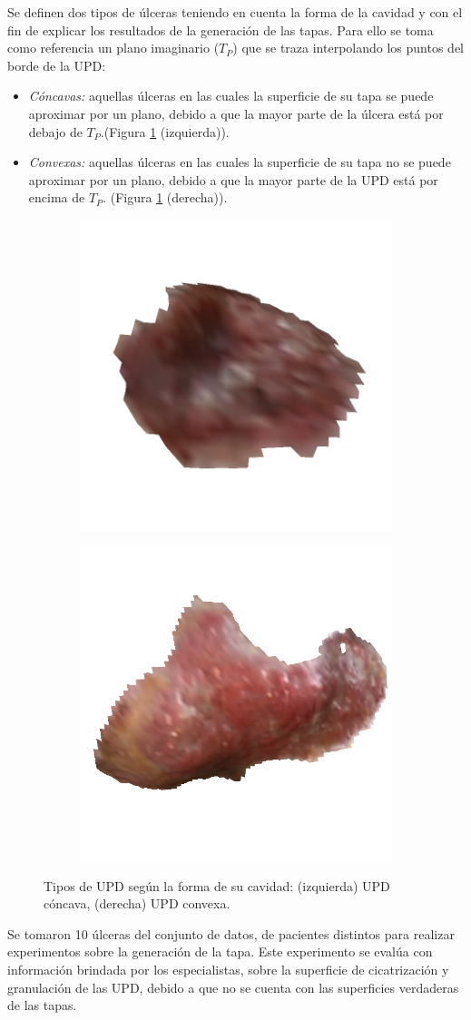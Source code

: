 Se definen dos tipos de úlceras teniendo en cuenta la forma de la cavidad y con el fin de explicar los resultados de la generación de las tapas. Para ello se toma como referencia un plano imaginario ($T_P$) que se traza interpolando los puntos del borde de la UPD:

\begin{itemize}
	\item \textit{Cóncavas:} aquellas úlceras en las cuales la superficie de su tapa se puede aproximar por un plano, debido a que la mayor parte de la úlcera está por debajo de $T_P$.(Figura \ref{fig:planar} (izquierda)).
	\item \textit{Convexas:} aquellas úlceras en las cuales la superficie de su tapa no se puede aproximar por un plano, debido a que la mayor parte de la UPD está por encima de $T_P$. (Figura \ref{fig:planar} (derecha)).
\end{itemize}

\begin{figure}[ht]
	\centering
	\begin{subfigure}
		\centering
		\includegraphics[width=.25\linewidth]{./Graphics/planar.png}
	\end{subfigure}
	\begin{subfigure}
		\centering
		\includegraphics[width=.25\linewidth]{./Graphics/noPlanar.png}
	\end{subfigure}
	\caption{Tipos de UPD según la forma de su cavidad: (izquierda) UPD cóncava, (derecha) UPD convexa.}
	\label{fig:planar}
\end{figure}

Se tomaron 10 úlceras del conjunto de datos, de pacientes distintos para realizar experimentos sobre la generación de la tapa. Este experimento se evalúa con información brindada por los especialistas, sobre la superficie de cicatrización y granulación de las UPD, debido a que no se cuenta con las superficies verdaderas de las tapas.

